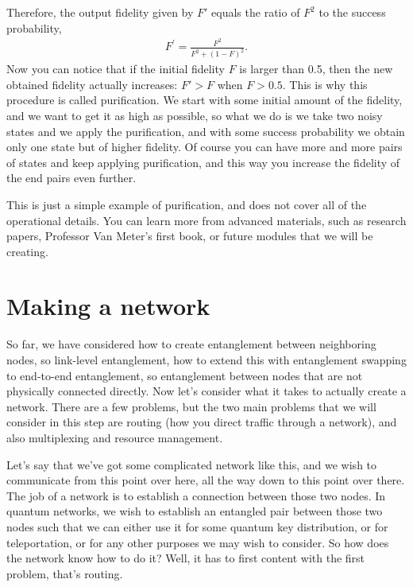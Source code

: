 Therefore, the output fidelity given by $F'$ equals the ratio of $F^2$ to the success probability,
\begin{align}
    F^{\prime}=\frac{F^{2}}{F^{2}+(1-F)^{2}}.
\end{align}
Now you can notice that if the initial fidelity $F$ is larger than 0.5, then the new obtained fidelity actually increases: $F' > F$ when $F > 0.5$. This is why this procedure is called purification. We start with some initial amount of the fidelity, and we want to get it as high as possible, so what we do is we take two noisy states and we apply the purification, and with some success probability we obtain only one state but of higher fidelity. Of course you can have more and more pairs of states and keep applying purification, and this way you increase the fidelity of the end pairs even further.

This is just a simple example of purification, and does not cover all of the operational details. You can learn more from advanced materials, such as research papers, Professor Van Meter's first book, or future modules that we will be creating.

\section{Making a network}


So far, we have considered how to create entanglement between neighboring nodes, so link-level entanglement, how to extend this with entanglement swapping to end-to-end entanglement, so entanglement between nodes that are not physically connected directly. Now let's consider what it takes to actually create a network. There are a few problems, but the two main problems that we will consider in this step are routing (how you direct traffic through a network), and also multiplexing and resource management.

Let's say that we've got some complicated network like this, and we wish to communicate from this point over here, all the way down to this point over there. The job of a network is to establish a connection between those two nodes. In quantum networks, we wish to establish an entangled pair between those two nodes such that we can either use it for some quantum key distribution, or for teleportation, or for any other purposes we may wish to consider. So how does the network know how to do it? Well, it has to first content with the first problem, that's routing.

